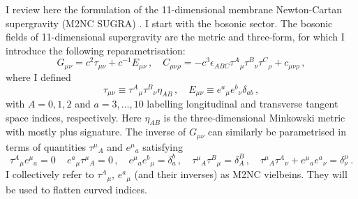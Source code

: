 \documentclass[11pt]{article}
\newcommand{\be}{\begin{equation}}
\newcommand{\ee}{\end{equation}}
\numberwithin{equation}{section}
\begin{document}
{{I review here the formulation of the 11-dimensional membrane Newton-Cartan supergravity (M2NC SUGRA) \cite{Blair:2021waq, Bergshoeff:2024nin}.
I start with the bosonic sector.
The bosonic fields of 11-dimensional supergravity are the metric and three-form, for which I introduce 
the following reparametrisation:
\be
G_{\mu\nu} = c^2 \tau_{\mu\nu} + c^{-1} E_{\mu\nu} \,,\quad
C_{\mu\nu\rho} = -c^3  \epsilon_{ABC} \tau^A{}_\mu \tau^B{}_\nu \tau^C{}_\rho + c_{\mu\nu\rho} \,,
\label{defmnc}
\ee
where I defined
\be
\tau_{\mu\nu} \equiv \tau^A{}_\mu \tau^B{}_\nu \eta_{AB} \,,\quad
E_{\mu\nu} \equiv e^a{}_\mu e^b{}_\nu \delta_{ab} \,,
\ee
with $A=0,1,2$ and $a=3,\dots,10$ labelling longitudinal and transverse tangent space indices, respectively.
Here $\eta_{AB}$ is the three-dimensional Minkowski metric with mostly plus signature.
The inverse of $G_{\mu\nu}$ can similarly be parametrised in terms of quantities $\tau^\mu{}_A$ and $e^\mu{}_a$ satisfying 
\be
\tau^A{}_\mu e^\mu{}_a = 0 \,\quad
e^a{}_\mu \tau^\mu{}_A = 0 \,,\quad
e^\mu{}_a e^b{}_\mu = \delta_a^b \,,\quad
\tau^\mu{}_A \tau^B{}_\mu = \delta_A^B\,,\quad
\tau^\mu{}_A \tau^A{}_\nu + e^\mu{}_a e^a{}_\nu = \delta^\mu_\nu \,.
\label{NCcomplete} 
\ee
I collectively refer to $\tau^A{}_\mu$, $e^a{}_\mu$ (and their inverses) as M2NC vielbeins.
They will be used to flatten curved indices. 

}}
\end{document}
